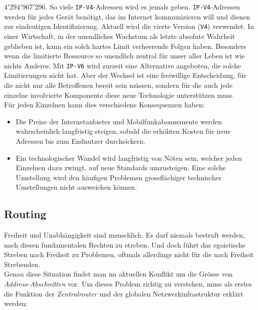 \documentclass[a4paper,11pt,titlepage,twoside]{memoir}
\begin{document}
\noindent \(4'294'967'296\). So viele \texttt{IP-V4}-Adressen wird es jemals
geben. \texttt{IP-V4}-Adressen werden für jedes Gerät benötigt, das im Internet
kommunizieren will und dienen zur eindeutigen Identifizierung. Aktuell
wird die vierte Version (\texttt{V4}) verwendet. In einer Wirtschaft, in der
unendliches Wachstum als letzte absolute Wahrheit geblieben ist, kann
ein solch hartes Limit verheerende Folgen haben. Besonders wenn die
limitierte Ressource so unendlich zentral für unser aller Leben ist
wie nichts Anderes. Mit \texttt{IP-V6} wird zurzeit eine Alternative angeboten,
die solche Limitierungen nicht hat. Aber der Wechsel ist eine
freiwillige Entscheidung, für die nicht nur alle Betroffenen bereit
sein müssen, sondern für die auch jede einzelne involvierte Komponente
diese neue Technologie unterstützen muss.\\

\noindent Für jeden Einzelnen kann dies verschiedene Konsequenzen
haben:
\begin{itemize}
\item Die Preise der Internetanbieter und Mobilfunkabonnemente werden
wahrscheinlich langfristig steigen, sobald die erhöhten Kosten für
neue Adressen bis zum Endnutzer durchsickern.
\item Ein technologischer Wandel wird langfristig von Nöten sein, welcher
jeden Einzelnen dazu zwingt, auf neue Standards umzusteigen. Eine
solche Umstellung wird den häufigen Problemen grossflächiger
technischer Umstellungen nicht ausweichen können.
\end{itemize}
\subsection{Routing}
\label{sec:org5608fdb}
Freiheit und Unabhängigkeit sind menschlich. Es darf niemals bestraft
werden, nach diesen fundamentalen Rechten zu streben. Und doch führt
das egoistische Streben nach Freiheit zu Problemen, oftmals allerdings
nicht für die nach Freiheit Strebenden.\\

\noindent Genau diese Situation findet man im aktuellen Konflikt um
die Grösse von \emph{Address-Abschnitten} vor. Um dieses Problem richtig zu
verstehen, muss als erstes die Funktion der \emph{Zentralrouter} und der
globalen Netzwerkinfrastruktur erklärt werden:\\
\end{document}
